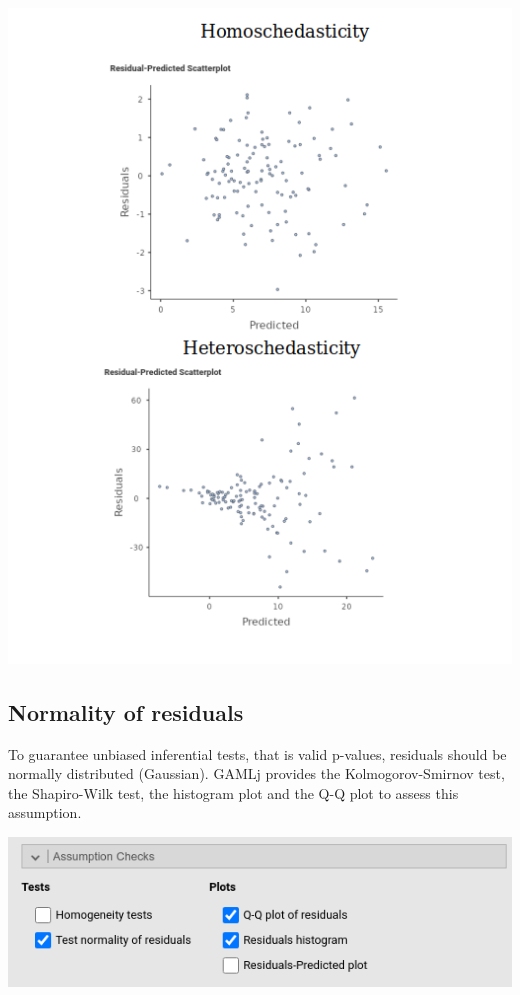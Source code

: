 \documentclass[
]{book}
\begin{document}
\includegraphics{bookletpics/2_assumptions_output2.png}

\hypertarget{normality-of-residuals}{%
\subsection{Normality of residuals}\label{normality-of-residuals}}

To guarantee unbiased inferential tests, that is valid p-values, residuals should be normally distributed (Gaussian). {GAMLj} provides the Kolmogorov-Smirnov test, the Shapiro-Wilk test, the histogram plot and the Q-Q plot to assess this assumption.

\includegraphics{bookletpics/2_assumptions_input3.png}
\end{document}
